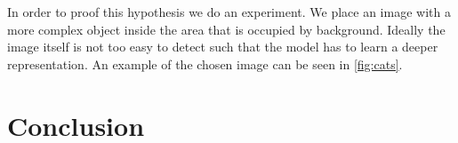 \documentclass{article}
\begin{document}
In order to proof this hypothesis we do an experiment. We place an image with a more complex object inside the area that is occupied by background. Ideally the image itself is not too easy to detect such that the model has to learn a deeper representation. An example of the chosen image can be seen in \autoref{fig:cats}.

%

\section{Conclusion}










\end{document}
